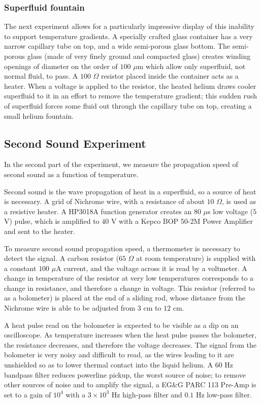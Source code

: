 \subsubsection{Superfluid fountain}\label{superfluidfountain}

The next experiment allows for a particularly impressive display of this inability to support temperature gradients. A specially crafted glass container has a very narrow capillary tube on top, and a wide semi-porous glass bottom. The semi-porous glass (made of very finely ground and compacted glass) creates winding openings of diameter on the order of $100$ $\mu$m which allow only superfluid, not normal fluid, to pass. A $100$ $\Omega$ resistor placed inside the container acts as a heater. When a voltage is applied to the resistor, the heated helium draws cooler superfluid to it in an effort to remove the temperature gradient; this sudden rush of superfluid forces some fluid out through the capillary tube on top, creating a small helium fountain.

\subsection{Second Sound Experiment}

In the second part of the experiment, we measure the propagation speed of second sound as a function of temperature.

Second sound is the wave propagation of heat in a superfluid, so a source of heat is necessary. A grid of Nichrome wire, with a resistance of about $10$ $\Omega$, is used as a resistive heater. A HP3018A function generator creates an $80$ $\mu$s low voltage ($5$ V) pulse, which is amplified to $40$ V with a Kepco BOP 50-2M Power Amplifier and sent to the heater. 

To measure second sound propagation speed, a thermometer is necessary
to detect the signal. A carbon resistor ($65$ $\Omega$ at room
temperature) is supplied with a constant $100$ $\mu$A current, and the
voltage across it is read by a voltmeter. A change in temperature of
the resistor at very low temperatures corresponds to a change in
resistance, and therefore a change in voltage. This resistor (referred
to as a bolometer) is placed at the end of a sliding rod, whose
distance from the Nichrome wire is able to be adjusted from $3$ cm to
$12$ cm.

A heat pulse read on the bolometer is expected to be visible as a dip
on an oscilloscope. As temperature increases when the heat pulse
passes the bolometer, the resistance decreases, and therefore the
voltage decreases. The signal from the bolometer is very noisy and
difficult to read, as the wires leading to it are unshielded so as to
lower thermal contact into the liquid helium. A $60$ Hz bandpass
filter reduces powerline pickup, the worst source of noise; to remove
other sources of noise and to amplify the signal, a EG\&G PARC 113
Pre-Amp is set to a gain of $10^4$ with a $3\times 10^3$ Hz high-pass
filter and $0.1$ Hz low-pass filter.

